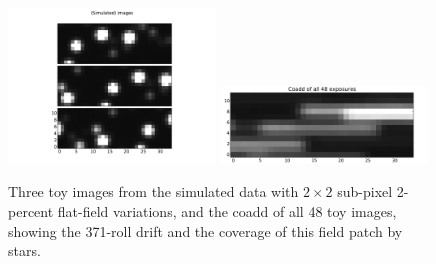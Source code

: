 \documentclass[letterpaper,12pt,whitepaper]{haastex}
\begin{document}
\begin{figure}
\includegraphics[trim=0.75in 0.25in 0.75in 0.25in, width=0.49\textwidth]{sim2-208}%
\includegraphics[trim=0.75in 0.00in 0.75in 0.00in, width=0.49\textwidth]{sim2-200}
\caption{Three toy images from the simulated data with $2\times 2$ sub-pixel 2-percent flat-field variations,
  and the coadd of all 48 toy images, showing the 371-roll drift and the coverage of this field patch by stars.
\label{fig:intra-data}}
\end{figure}
\end{document}
